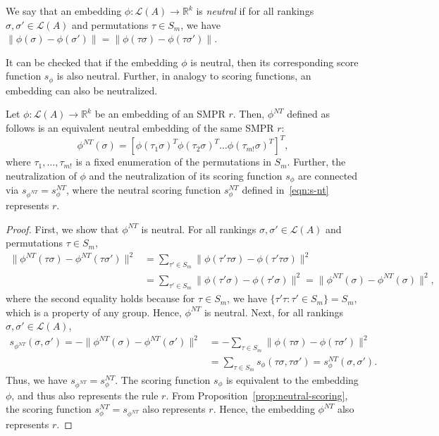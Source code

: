 \documentclass[prodmode]{acmsmall-ec14}
\newcommand{\calL}{{\mathcal{L}}}
\newcommand{\rank}{{\calL(A)}}
\newcommand{\nt}{NT}
\begin{document}
\begin{definition}
We say that an embedding $\phi:\rank \rightarrow \mathbb{R}^k$ is \emph{neutral} if for all rankings $\sigma,\sigma' \in \rank$ and permutations $\tau \in S_m$, we have $\|\phi(\sigma)-\phi(\sigma')\| = \|\phi(\tau \sigma)-\phi(\tau\sigma')\|$.
\end{definition}
%
It can be checked that if the embedding $\phi$ is neutral, then its corresponding score function $s_{\phi}$ is also neutral. Further, in analogy to scoring functions, an embedding can also be neutralized. 

\begin{lemma}
Let $\phi: \rank \to \mathbb{R}^k$ be an embedding of an SMPR $r$. Then, $\phi^{\nt}$ defined as follows is an equivalent neutral embedding of the same SMPR $r$: 
\begin{equation}
\phi^{\nt}(\sigma) = [\phi(\tau_1 \sigma)^T \phi(\tau_2 \sigma)^T \ldots \phi(\tau_{m!} \sigma)^T]^T,
\label{eqn:phi-nt}
\end{equation}
where $\tau_1,\ldots,\tau_{m!}$ is a fixed enumeration of the permutations in $S_m$. Further, the neutralization of $\phi$ and the neutralization of its scoring function $s_{\phi}$ are connected via $s_{\phi^{\nt}} = s ^{\nt}_{\phi}$, where the neutral scoring function $s ^{\nt}_{\phi}$ defined in~\eqref{eqn:s-nt} represents $r$. 
\label{lem:neutral-embedding}
\end{lemma}
\begin{proof}
First, we show that $\phi^{\nt}$ is neutral. For all rankings $\sigma,\sigma' \in \rank$ and permutations $\tau \in S_m$, 
\begin{align*}
\|\phi^{\nt}(\tau \sigma)-\phi^{\nt}(\tau \sigma')\|^2 &= \sum_{\tau' \in S_m} \|\phi(\tau' \tau \sigma)-\phi(\tau' \tau \sigma)\|^2 \\
&= \sum_{\tau' \in S_m} \|\phi(\tau' \sigma)-\phi(\tau' \sigma)\|^2 = \|\phi^{\nt}(\sigma)-\phi^{\nt}(\sigma)\|^2,
\end{align*}
where the second equality holds because for $\tau \in S_m$, we have $\{\tau' \tau : \tau' \in S_m\} = S_m$, which is a property of any group. Hence, $\phi^{\nt}$ is neutral. Next, for all rankings $\sigma,\sigma' \in \rank$, 
\begin{align*}
s_{\phi^{\nt}}(\sigma,\sigma') = -\|\phi^{\nt}(\sigma)-\phi^{\nt}(\sigma')\|^2 &= - \sum_{\tau \in S_m} \|\phi(\tau \sigma)-\phi(\tau \sigma')\|^2  \\
&= \sum_{\tau \in S_m} s_{\phi}(\tau \sigma,\tau \sigma') = s_{\phi}^{\nt}(\sigma,\sigma').
\end{align*}
Thus, we have $s_{\phi^{\nt}} = s_{\phi}^{\nt}$. The scoring function $s_{\phi}$ is equivalent to the embedding $\phi$, and thus also represents the rule $r$. From Proposition~\ref{prop:neutral-scoring}, the scoring function $s_{\phi}^{\nt} = s_{\phi^{\nt}}$ also represents $r$. Hence, the embedding $\phi^{\nt}$ also represents $r$. 
\end{proof}
\end{document}
